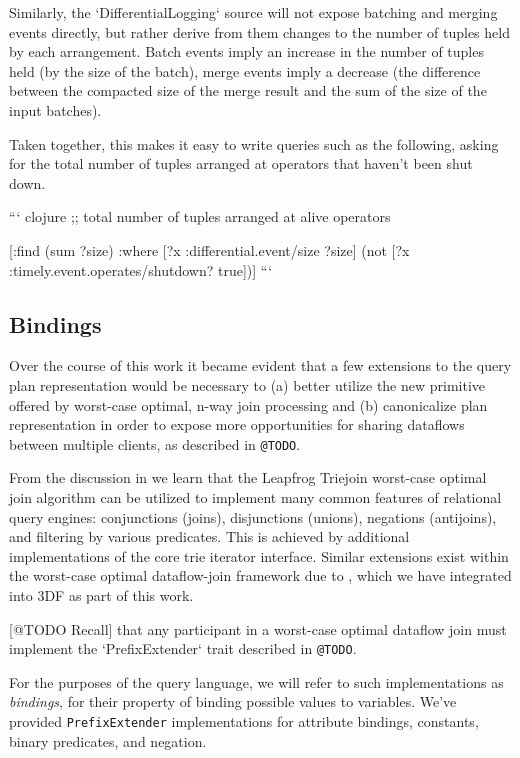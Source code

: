 \documentclass[../index.tex]{subfiles}
\begin{document}
Similarly, the `DifferentialLogging` source will not expose batching
and merging events directly, but rather derive from them changes to
the number of tuples held by each arrangement. Batch events imply an
increase in the number of tuples held (by the size of the batch),
merge events imply a decrease (the difference between the compacted
size of the merge result and the sum of the size of the input
batches).

Taken together, this makes it easy to write queries such as the
following, asking for the total number of tuples arranged at operators
that haven't been shut down.

``` clojure
;; total number of tuples arranged at alive operators

[:find (sum ?size)
 :where
 [?x :differential.event/size ?size]
 (not [?x :timely.event.operates/shutdown? true])]
```

\subsection{Bindings} \label{bindings}

Over the course of this work it became evident that a few extensions
to the query plan representation would be necessary to (a) better
utilize the new primitive offered by worst-case optimal, n-way join
processing and (b) canonicalize plan representation in order to expose
more opportunities for sharing dataflows between multiple clients, as
described in \texttt{@TODO}.

From the discussion in \cite{veldhuizen2012leapfrog} we learn that the
Leapfrog Triejoin worst-case optimal join algorithm can be utilized to
implement many common features of relational query engines:
conjunctions (joins), disjunctions (unions), negations (antijoins),
and filtering by various predicates. This is achieved by additional
implementations of the core trie iterator interface. Similar
extensions exist within the worst-case optimal dataflow-join framework
due to \cite{ammar2018distributed}, which we have integrated into 3DF
as part of this work.

[@TODO Recall] that any participant in a worst-case optimal dataflow
join must implement the `PrefixExtender` trait described in
\texttt{@TODO}.

For the purposes of the query language, we will refer to such
implementations as \emph{bindings}, for their property of binding
possible values to variables. We've provided \texttt{PrefixExtender}
implementations for attribute bindings, constants, binary predicates,
and negation.
\end{document}
